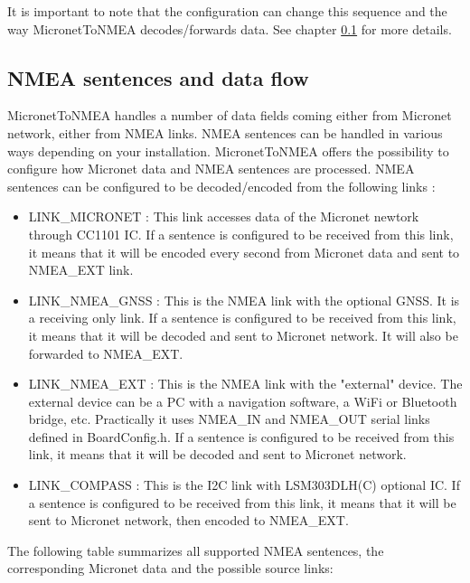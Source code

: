 \documentclass{report}
\begin{document}
It is important to note that the configuration can change this sequence and the way MicronetToNMEA decodes/forwards data. See chapter {\ref{supportednmeasentences}} for more details.

\subsection{NMEA sentences and data flow}\label{supportednmeasentences}

MicronetToNMEA handles a number of data fields coming either from Micronet network, either from NMEA links.
NMEA sentences can be handled in various ways depending on your installation. MicronetToNMEA offers the possibility to configure how Micronet data and NMEA sentences are processed. NMEA sentences can be configured to be decoded/encoded from the following links :
\begin{itemize}
	\item LINK\_MICRONET : This link accesses data of the Micronet newtork through CC1101 IC. If a sentence is configured to be received from this link, it means that it will be encoded every second from Micronet data and sent to NMEA\_EXT link.
	\item LINK\_NMEA\_GNSS : This is the NMEA link with the optional GNSS. It is a receiving only link. If a sentence is configured to be received from this link, it means that it will be decoded and sent to Micronet network. It will also be forwarded to NMEA\_EXT.
	\item LINK\_NMEA\_EXT : This is the NMEA link with the "external" device. The external device can be a PC with a navigation software, a WiFi or Bluetooth bridge, etc. Practically it uses NMEA\_IN and NMEA\_OUT serial links defined in BoardConfig.h. If a sentence is configured to be received from this link, it means that it will be decoded and sent to Micronet network.
	\item LINK\_COMPASS : This is the I2C link with LSM303DLH(C) optional IC. If a sentence is configured to be received from this link, it means that it will be sent to Micronet network, then encoded to NMEA\_EXT. 
\end{itemize}

The following table summarizes all supported NMEA sentences, the corresponding Micronet data and the possible source links:
\end{document}
